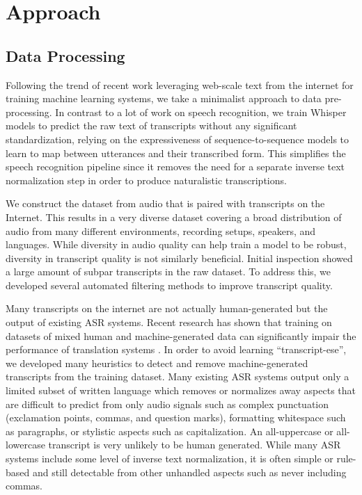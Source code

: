 \section{Approach}\label{sec:approach}

\subsection{Data Processing}\label{subsec:data}

Following the trend of recent work leveraging web-scale text from the internet for training machine learning systems, we take a minimalist approach to data pre-processing. In contrast to a lot of work on speech recognition, we train Whisper models to predict the raw text of transcripts without any significant standardization, relying on the expressiveness of sequence-to-sequence models to learn to map between utterances and their transcribed form. This simplifies the speech recognition pipeline since it removes the need for a separate inverse text normalization step in order to produce naturalistic transcriptions. 

We construct the dataset from audio that is paired with transcripts on the Internet. This results in a very diverse dataset covering a broad distribution of audio from many different environments, recording setups, speakers, and languages. While diversity in audio quality can help train a model to be robust, diversity in transcript quality is not similarly beneficial. Initial inspection showed a large amount of subpar transcripts in the raw dataset. To address this, we developed several automated filtering methods to improve transcript quality. 

Many transcripts on the internet are not actually human-generated but the output of existing ASR systems. Recent research has shown that training on datasets of mixed human and machine-generated data can significantly impair the performance of translation systems \cite{ghorbani2021scaling}. In order to avoid learning ``transcript-ese'', we developed many heuristics to detect and remove machine-generated transcripts from the training dataset. Many existing ASR systems output only a limited subset of written language which removes or normalizes away aspects that are difficult to predict from only audio signals such as complex punctuation (exclamation points, commas, and question marks), formatting whitespace such as paragraphs, or stylistic aspects such as capitalization. An all-uppercase or all-lowercase transcript is very unlikely to be human generated. While many ASR systems include some level of inverse text normalization, it is often simple or rule-based and still detectable from other unhandled aspects such as never including commas.

